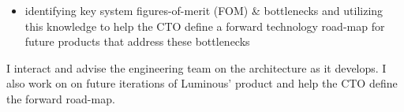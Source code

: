 \documentclass[10pt,a4paper]{article}
\begin{document}
{{{\begin{itemize}
      \item identifying key system figures-of-merit (FOM) \& bottlenecks and utilizing this knowledge to help the CTO define a forward technology road-map for future products that address these bottlenecks
    \end{itemize}
    I interact and advise the engineering team on the architecture as it develops. I also work on on future iterations of Luminous’ product and help the CTO define the forward road-map.






  }}

}
\end{document}
